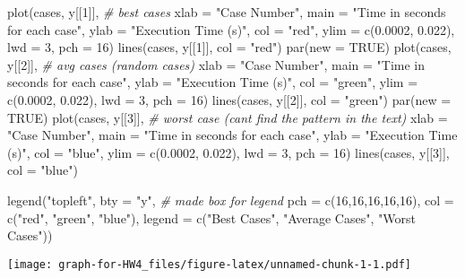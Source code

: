 \documentclass[
]{article}
\newenvironment{Shaded}{\begin{snugshade}}{\end{snugshade}}
\newcommand{\AttributeTok}[1]{\textcolor[rgb]{0.77,0.63,0.00}{#1}}
\newcommand{\CommentTok}[1]{\textcolor[rgb]{0.56,0.35,0.01}{\textit{#1}}}
\newcommand{\ConstantTok}[1]{\textcolor[rgb]{0.00,0.00,0.00}{#1}}
\newcommand{\DecValTok}[1]{\textcolor[rgb]{0.00,0.00,0.81}{#1}}
\newcommand{\FloatTok}[1]{\textcolor[rgb]{0.00,0.00,0.81}{#1}}
\newcommand{\FunctionTok}[1]{\textcolor[rgb]{0.00,0.00,0.00}{#1}}
\newcommand{\NormalTok}[1]{#1}
\newcommand{\StringTok}[1]{\textcolor[rgb]{0.31,0.60,0.02}{#1}}
\begin{document}
\begin{Shaded}
\begin{Highlighting}[]
\FunctionTok{plot}\NormalTok{(cases, y[[}\DecValTok{1}\NormalTok{]], }\CommentTok{\# best cases}
     \AttributeTok{xlab =} \StringTok{"Case Number"}\NormalTok{, }
     \AttributeTok{main =} \StringTok{"Time in seconds for each case"}\NormalTok{, }
     \AttributeTok{ylab =} \StringTok{"Execution Time (s)"}\NormalTok{, }
     \AttributeTok{col =} \StringTok{"red"}\NormalTok{,}
     \AttributeTok{ylim =} \FunctionTok{c}\NormalTok{(}\FloatTok{0.0002}\NormalTok{, }\FloatTok{0.022}\NormalTok{), }
     \AttributeTok{lwd =} \DecValTok{3}\NormalTok{, }
     \AttributeTok{pch =} \DecValTok{16}\NormalTok{)}
\FunctionTok{lines}\NormalTok{(cases, y[[}\DecValTok{1}\NormalTok{]], }\AttributeTok{col =} \StringTok{"red"}\NormalTok{)}
\FunctionTok{par}\NormalTok{(}\AttributeTok{new =} \ConstantTok{TRUE}\NormalTok{)}
\FunctionTok{plot}\NormalTok{(cases, y[[}\DecValTok{2}\NormalTok{]], }\CommentTok{\# avg cases (random cases)}
     \AttributeTok{xlab =} \StringTok{"Case Number"}\NormalTok{, }
     \AttributeTok{main =} \StringTok{"Time in seconds for each case"}\NormalTok{, }
     \AttributeTok{ylab =} \StringTok{"Execution Time (s)"}\NormalTok{, }
     \AttributeTok{col =} \StringTok{"green"}\NormalTok{,}
     \AttributeTok{ylim =} \FunctionTok{c}\NormalTok{(}\FloatTok{0.0002}\NormalTok{, }\FloatTok{0.022}\NormalTok{), }
     \AttributeTok{lwd =} \DecValTok{3}\NormalTok{, }
     \AttributeTok{pch =} \DecValTok{16}\NormalTok{)}
\FunctionTok{lines}\NormalTok{(cases, y[[}\DecValTok{2}\NormalTok{]], }\AttributeTok{col =} \StringTok{"green"}\NormalTok{)}
\FunctionTok{par}\NormalTok{(}\AttributeTok{new =} \ConstantTok{TRUE}\NormalTok{)}
\FunctionTok{plot}\NormalTok{(cases, y[[}\DecValTok{3}\NormalTok{]], }\CommentTok{\# worst case (can\textquotesingle{}t find the pattern in the text)}
     \AttributeTok{xlab =} \StringTok{"Case Number"}\NormalTok{, }
     \AttributeTok{main =} \StringTok{"Time in seconds for each case"}\NormalTok{, }
     \AttributeTok{ylab =} \StringTok{"Execution Time (s)"}\NormalTok{, }
     \AttributeTok{col =} \StringTok{"blue"}\NormalTok{, }
     \AttributeTok{ylim =} \FunctionTok{c}\NormalTok{(}\FloatTok{0.0002}\NormalTok{, }\FloatTok{0.022}\NormalTok{), }
     \AttributeTok{lwd =} \DecValTok{3}\NormalTok{, }
     \AttributeTok{pch =} \DecValTok{16}\NormalTok{)}
\FunctionTok{lines}\NormalTok{(cases, y[[}\DecValTok{3}\NormalTok{]], }\AttributeTok{col =} \StringTok{"blue"}\NormalTok{)}

\FunctionTok{legend}\NormalTok{(}\StringTok{"topleft"}\NormalTok{, }
       \AttributeTok{bty =} \StringTok{"y"}\NormalTok{, }\CommentTok{\# made box for legend }
       \AttributeTok{pch =} \FunctionTok{c}\NormalTok{(}\DecValTok{16}\NormalTok{,}\DecValTok{16}\NormalTok{,}\DecValTok{16}\NormalTok{,}\DecValTok{16}\NormalTok{,}\DecValTok{16}\NormalTok{),}
       \AttributeTok{col =} \FunctionTok{c}\NormalTok{(}\StringTok{"red"}\NormalTok{, }\StringTok{"green"}\NormalTok{, }\StringTok{"blue"}\NormalTok{), }
       \AttributeTok{legend =} \FunctionTok{c}\NormalTok{(}\StringTok{"Best Cases"}\NormalTok{,}
                  \StringTok{"Average Cases"}\NormalTok{, }
                  \StringTok{"Worst Cases"}\NormalTok{))}
\end{Highlighting}
\end{Shaded}

\texttt{[image: graph-for-HW4\_files/figure-latex/unnamed-chunk-1-1.pdf]}
\end{document}

